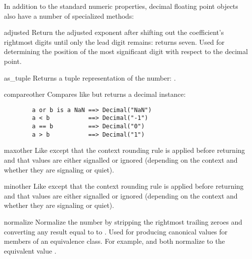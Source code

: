 In addition to the standard numeric properties, decimal floating point objects
also have a number of specialized methods:

\begin{methoddesc}{adjusted}{}
  Return the adjusted exponent after shifting out the coefficient's rightmost
  digits until only the lead digit remains: 
  returns seven.  Used for determining the position of the most significant
  digit with respect to the decimal point.
\end{methoddesc}

\begin{methoddesc}{as_tuple}{}
  Returns a tuple representation of the number:
  .
\end{methoddesc}

\begin{methoddesc}{compare}{other}
  Compares like  but returns a decimal instance:
  \begin{verbatim}
        a or b is a NaN ==> Decimal("NaN")
        a < b           ==> Decimal("-1")
        a == b          ==> Decimal("0")
        a > b           ==> Decimal("1")
  \end{verbatim}
\end{methoddesc}

\begin{methoddesc}{max}{other}
  Like  except that the context rounding rule
  is applied before returning and that  values are
  either signalled or ignored (depending on the context and whether
  they are signaling or quiet).
\end{methoddesc}

\begin{methoddesc}{min}{other}
  Like  except that the context rounding rule
  is applied before returning and that  values are
  either signalled or ignored (depending on the context and whether
  they are signaling or quiet).
\end{methoddesc}

\begin{methoddesc}{normalize}{}
  Normalize the number by stripping the rightmost trailing zeroes and
  converting any result equal to  to
  . Used for producing canonical values for members
  of an equivalence class. For example,  and
   both normalize to the equivalent value
  .
\end{methoddesc}                                              

